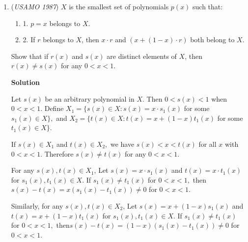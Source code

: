 \begin{enumerate}
 Then $\angle DSE=2\angle DBE=\beta$, and since $SD=SE$ we get $\angle SDE=90^\circ-\dfrac{\beta}{2}$. Similarly $\angle KDF=90^\circ-\dfrac{\gamma}{2}$. Also $\angle SDK=180^\circ-60^\circ-60^\circ=60^\circ$.

 Measuring from $DC$ we have $\angle CDE=30^\circ+\dfrac{\beta}{2}$, $\angle CDK=60^\circ$, $\angle CDS=120^\circ$ and $\angle CDF=150^\circ-\dfrac{\gamma}{2}$. Since $\beta,\gamma<60^\circ$, the rays occur in the order $DE,DK,DS,DF$, so $\angle SDE$ and $\angle KDF$ overlap exactly in $\angle SDK$. Therefore
 \[\angle EDF=\left(90^\circ-\dfrac{\beta}{2}\right)+\left(90^\circ-\dfrac{\gamma}{2}\right)-60^\circ=120^\circ-\dfrac{\beta+\gamma}{2}.\]But $\beta+\gamma=60^\circ$, so $\angle EDF=90^\circ$. Q.E.D.

 


	\item (\textit{USAMO 1987}) $X$ is the smallest set of polynomials $p(x)$ such that: 


 
            \begin{enumerate}[label=(\roman*)]
                \item 1. $p = x$ belongs to $X$.
\item 2. If $r$ belongs to $X$, then $x\cdot r$ and $(x + (1 - x) \cdot r )$ both belong to $X$.
            \end{enumerate}
            Show that if $r(x)$ and $s(x)$ are distinct elements of $X$, then $r(x) \neq s(x)$ for any $0 < x < 1$. 


 



\textbf{Solution}

Let $s(x)$ be an arbitrary polynomial in $X.$ Then $0<s(x)<1$ when $0<x<1.$ Define $X_1=\{s(x)\in X:s(x)=x\cdot s_1(x)$ for some $s_1(x)\in X\},$ and $X_2=\{t(x)\in X: t(x)=x+(1-x)t_1(x)$ for some $t_1(x)\in X\}.$

 If $s(x) \in X_1$ and $t(x)\in X_2,$ we have $s(x) <x<t(x)$ for all $x$ with $0<x<1.$ Therefore $s(x)\ne t(x)$ for any $0<x<1.$

 For any $s(x), t(x) \in X_1$, Let $s(x)=x\cdot s_1(x)$ and $t(x)=x\cdot t_1(x)$ for $s_1(x), t_1(x) \in X.$ If $s_1(x) \ne t_1(x)$ for $0<x<1,$ then$s(x)-t(x)=x(s_1(x)-t_1(x))\ne 0$ for $0<x<1.$

 Similarly, for any $s(x), t(x) \in X_2$, Let $s(x)=x+(1-x) s_1(x)$ and $t(x)=x+(1-x) t_1(x)$ for $s_1(x), t_1(x) \in X.$ If $s_1(x) \ne t_1(x)$ for $0<x<1,$ then$s(x)-t(x)=(1-x)(s_1(x)-t_1(x))\ne 0$ for $0<x<1.$


\end{enumerate}
